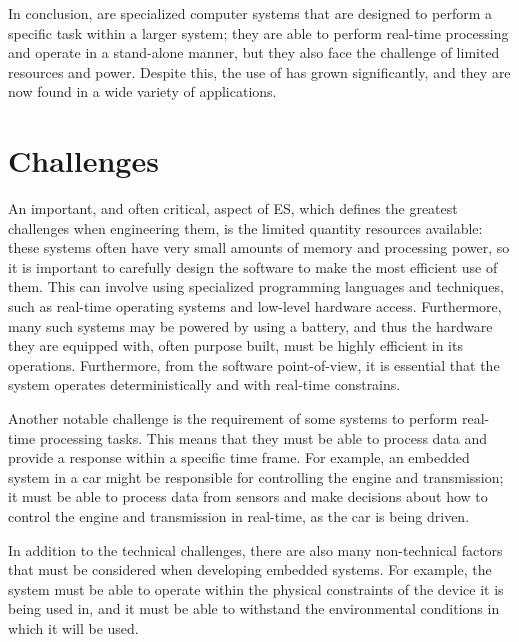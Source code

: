 In conclusion, \ess are specialized computer systems that are designed to perform a specific task within a larger system; they are able to perform real-time processing and operate in a stand-alone manner, but they also face the challenge of limited resources and power. Despite this, the use of \ess has grown significantly, and they are now found in a wide variety of applications.



\section {Challenges}
An important, and often critical, aspect of ES, which defines the greatest challenges when engineering them, is the limited quantity resources available: these systems often have very small amounts of memory and processing power, so it is important to carefully design the software to make the most efficient use of them. This can involve using specialized programming languages and techniques, such as real-time operating systems and low-level hardware access. Furthermore, many such systems may be powered by using a battery, and thus the hardware they are equipped with, often purpose built, must be highly efficient in its operations. Furthermore, from the software point-of-view, it is essential that the system operates deterministically and with real-time constrains.

Another notable challenge is the requirement of some systems to perform real-time processing tasks. This means that they must be able to process data and provide a response within a specific time frame. For example, an embedded system in a car might be responsible for controlling the engine and transmission; it must be able to process data from sensors and make decisions about how to control the engine and transmission in real-time, as the car is being driven.

In addition to the technical challenges, there are also many non-technical factors that must be considered when developing embedded systems. For example, the system must be able to operate within the physical constraints of the device it is being used in, and it must be able to withstand the environmental conditions in which it will be used.



